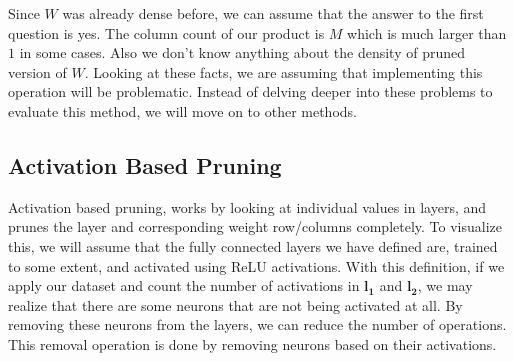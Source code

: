 Since $W$ was already dense before, we can assume that the answer to the first question is yes. The column count of our product is $M$ which is much larger than $1$ in some cases. Also we don't know anything about the density of pruned version of $W$. Looking at these facts, we are assuming that implementing this operation will be problematic. Instead of delving deeper into these problems to evaluate this method, we will move on to other methods.

\subsection{Activation Based Pruning}
Activation based pruning, works by looking at individual values in layers, and prunes the layer and corresponding weight row/columns completely. To visualize this, we will assume that the fully connected layers we have defined are, trained to some extent, and activated using ReLU activations. With this definition, if we apply our dataset and count the number of activations in $\mathbf{l_1}$ and $\mathbf{l_2}$, we may realize that there are some neurons that are not being activated at all. By removing these neurons from the layers, we can reduce the number of operations. This removal operation is done by removing neurons based on their activations. 


